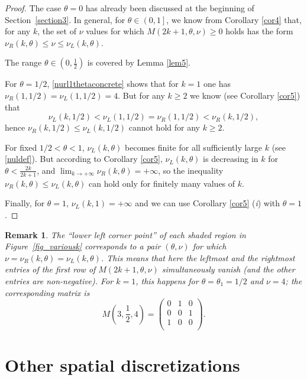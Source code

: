 \documentclass[a4paper]{article}
\newtheorem{remark}{Remark}
\newcommand{\te}{\theta}
\newcommand{\nul}{\nu_L(k,\theta)}
\newcommand{\nur}{\nu_R(k,\theta)}
\begin{document}
\begin{proof} The case $\te=0$ has already been discussed at the beginning of Section~\ref{section3}.
In general, for $\te\in\left(0,1\right]$, we know from Corollary \ref{cor4} that, for any $k$, the set of $\nu$ values for which $M(2k+1,\te,\nu)\ge 0$ holds has the form $\nur\le\nu\le\nul$. 

The range $\te\in\left(0,\frac{1}{2}\right)$ is covered by Lemma \ref{lem5}. 

For $\te=1/2$, \eqref{nurl1thetaconcrete} shows that for $k=1$ one has $\nu_R(1,1/2)=\nu_L(1,1/2)=4$. 
But for any $k\ge 2$ we know (see Corollary \ref{cor5}) that
\[
\nu_L(k,1/2)<\nu_L(1,1/2)=\nu_R(1,1/2)<\nu_R(k,1/2),
\]
hence $\nu_R(k,1/2)\le\nu_L(k,1/2)$ cannot hold for any $k\ge 2$.

For fixed $1/2<\te<1$, $\nul$ becomes finite for all sufficiently large $k$ (see \eqref{nuldef}). But according to Corollary \ref{cor5}, $\nul$ is decreasing in $k$ for $\te<\frac{2k}{2k+1}$, and 
$\lim_{k\to+\infty} \nur=+\infty$, so the inequality $\nur\le\nul$ can hold only for finitely many values of $k$.

Finally, for $\te=1$, $\nu_L(k,1)=+\infty$ and we can use Corollary \ref{cor5} (\textit{i}) with $\te=1$.
\end{proof}

\begin{remark}
The ``lower left corner point'' of each shaded region in Figure~\ref{fig_variousk} corresponds to a pair 
$(\te,\nu)$  for which $\nu=\nur=\nul$. This means that here the leftmost and the rightmost entries of the first row of $M(2k+1,\te,\nu)$ simultaneously vanish (and the other entries are non-negative). For $k=1$, this happens for $\te=\te_1=1/2$ and $\nu=4$; the corresponding matrix is
\begin{equation}\label{rem10thetahalfmatrix}
M\left(3,\frac{1}{2},4\right)=\left(
\begin{array}{ccc}
 0 & 1 & 0 \\
 0 & 0 & 1 \\
 1 & 0 & 0 \\
\end{array}
\right).
\end{equation}
\end{remark}


\section{Other spatial discretizations}\label{otherdisc}
\end{document}
